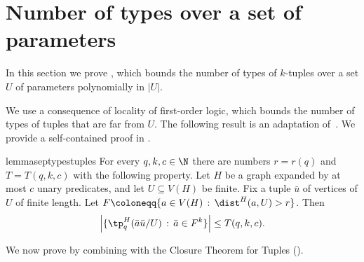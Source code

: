 
\section{Number of types over a set of parameters}\label{sec:types-over-sets}
In this section we prove , which bounds the number of types of $k$-tuples over a set $U$ of parameters polynomially in $|U|$.

We use a consequence of locality of first-order logic, which bounds the number of types of tuples that are far from $U$.
The following result is an adaptation of~\cite[Corollary~16]{number-of-types}. We provide a self-contained proof in .

\begin{restatable}{lemma}{septypestuples}\label{lem:sep-types-tuple}
    For every $q,k,c\in\N$ there are numbers $r=r(q)$ and $T=T(q,k,c)$ with the following property. Let $H$ be a graph expanded by at most $c$ unary predicates, and let $U\subseteq V(H)$ be finite. Fix a tuple $\bar u$ of vertices of $U$ of finite length.
    Let $F \coloneqq \{a\in V(H) \,:\, \dist^H(a,U) > r\}$.
    Then
    \[
      \left|
        \{
        \tp_q^H(\bar a\bar u/U) \,:\, \bar a \in F^k
        \}
      \right|
      \leq
      T(q,k,c).
    \]
\end{restatable}

We now prove  by combining  with the Closure Theorem for Tuples ().

{\typeboundgeneraltrue\thmtypes*}

